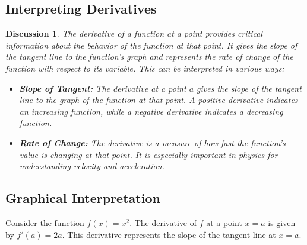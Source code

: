 \documentclass[a4paper,12pt]{book}
\newtheorem{discussion}{Discussion}
\begin{document}
\subsection{Interpreting Derivatives}

\begin{discussion}
The derivative of a function at a point provides critical information about the behavior of the function at that point. It gives the slope of the tangent line to the function's graph and represents the rate of change of the function with respect to its variable. This can be interpreted in various ways:

\begin{itemize}
    \item \textbf{Slope of Tangent:} The derivative at a point \(a\) gives the slope of the tangent line to the graph of the function at that point. A positive derivative indicates an increasing function, while a negative derivative indicates a decreasing function.
    \item \textbf{Rate of Change:} The derivative is a measure of how fast the function's value is changing at that point. It is especially important in physics for understanding velocity and acceleration.
\end{itemize}
\end{discussion}

\subsection{Graphical Interpretation}
Consider the function \( f(x) = x^2 \). The derivative of \( f \) at a point \( x = a \) is given by \( f'(a) = 2a \). This derivative represents the slope of the tangent line at \( x = a \).

\begin{center}
\end{center}
\end{document}
